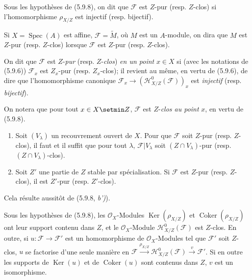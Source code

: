 \begin{definition}[5.9.9]
\label{IV.2.s5.9.9-fr}
Sous les hypothèses de \textup{(5.9.8)}, on dit que $\mathcal F$ est $Z$-pur
(\textup{resp.} $Z$-clos) si l'homomorphisme $\rho_{X/Z}$ est injectif
(\textup{resp.} bijectif).
\end{definition}

Si $X=\operatorname{Spec}(A)$ est affine, $\mathcal F=\widetilde M$, où
$M$ est un $A$-module, on dira que $M$ est $Z$-pur (resp. $Z$-clos) lorsque
$\mathcal F$ est $Z$-pur (resp. $Z$-clos).

On dit que $\mathcal F$ est $Z$-\emph{pur} (resp. $Z$-\emph{clos}) \emph{en un point}
$x\in X$ si (avec les notations de (5.9.6)) $\mathcal F_x$ est
$Z_x$-pur (resp. $Z_x$-clos); il revient au même, en vertu de (5.9.6), de
dire que l'homomorphisme canonique
$\mathcal F_x\longrightarrow(\mathcal H^0_{X/Z}(\mathcal F))_x$
est \emph{injectif} (resp. \emph{bijectif}).

On notera que pour tout $x\in X\setmin Z$, $\mathcal F$ est $Z$-\emph{clos au point} $x$,
en vertu de (5.9.8).

\begin{corollary}[5.9.10]
\label{IV.2.s5.9.10-fr}
\begin{enumerate}
\item[\textup{(i)}] Soit $(V_\lambda)$ un recouvrement ouvert de $X$. Pour que
$\mathcal F$ soit $Z$-pur (\textup{resp.} $Z$-clos), il faut et il suffit que pour
tout $\lambda$, $\mathcal F|V_\lambda$ soit $(Z\cap V_\lambda)$-pur
(\textup{resp.} $(Z\cap V_\lambda)$-clos).
\item[\textup{(ii)}] Soit $Z'$ une partie de $Z$ stable par spécialisation. Si
$\mathcal F$ est $Z$-pur (\textup{resp.} $Z$-clos), il est $Z'$-pur
(\textup{resp.} $Z'$-clos).
\end{enumerate}
\end{corollary}

Cela résulte aussitôt de (5.9.8, \emph{b')}).

\begin{proposition}[5.9.11]
\label{IV.2.s5.9.11-fr}
Sous les hypothèses de \textup{(5.9.8)}, les $\mathcal O_X$-Modules
$\operatorname{Ker}(\rho_{X/Z})$ et $\operatorname{Coker}(\rho_{X/Z})$ ont
leur support contenu dans $Z$, et le $\mathcal O_X$-Module
$\mathcal H^0_{X/Z}(\mathcal F)$ est $Z$-clos. En outre, si
$u:\mathcal F\to\mathcal F'$ est un homomorphisme de
$\mathcal O_X$-Modules tel que $\mathcal F'$ soit $Z$-clos, $u$ se factorise
d'une seule manière en
$\mathcal F\xrightarrow{\rho_{X/Z}}\mathcal H^0_{X/Z}(\mathcal F)
\xrightarrow{v}\mathcal F'$.
Si en outre les supports de $\operatorname{Ker}(u)$ et de
$\operatorname{Coker}(u)$ sont contenus dans $Z$, $v$ est un isomorphisme.
\end{proposition}

